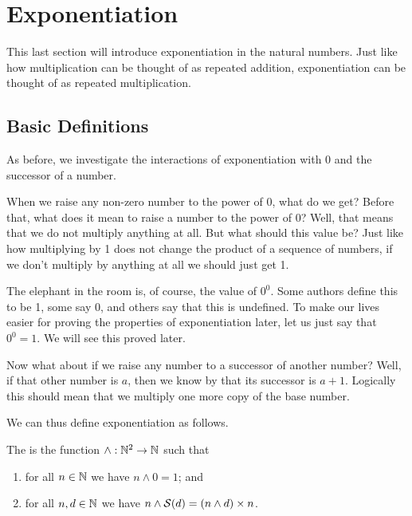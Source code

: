 \section{Exponentiation}
This last section will introduce exponentiation in the natural numbers. Just like how multiplication can be thought of as repeated addition, exponentiation can be thought of as repeated multiplication.

\subsection{Basic Definitions}
As before, we investigate the interactions of exponentiation with 0 and the successor of a number.

When we raise any non-zero number to the power of 0, what do we get? Before that, what does it mean to raise a number to the power of 0? Well, that means that we do not multiply anything at all. But what should this value be? Just like how multiplying by 1 does not change the product of a sequence of numbers, if we don't multiply by anything at all we should just get 1.

\begin{remark}[$0^0$]
    The elephant in the room is, of course, the value of $0^0$. Some authors define this to be 1, some say 0, and others say that this is undefined. To make our lives easier for proving the properties of exponentiation later, let us just say that $0^0 = 1$. We will see this proved later.
\end{remark}

Now what about if we raise any number to a successor of another number? Well, if that other number is $a$, then we know by  that its successor is $a+1$. Logically this should mean that we multiply one more copy of the base number.

We can thus define exponentiation as follows.

\begin{definition}
    The  is the function $\wedge: \mathbb{N}^2 \to \mathbb{N}$ such that
    \begin{enumerate}[label=\textbf{E\arabic*.}]
        \item for all $n \in \mathbb{N}$ we have $n \wedge 0 = 1$; and
        \item for all $n, d \in \mathbb{N}$ we have $n \wedge {\mathcal{S}(d)} = (n \wedge d) \times n$.
    \end{enumerate}
\end{definition}

